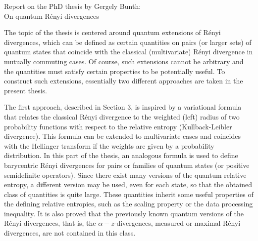 \documentclass[12pt]{article}
\begin{document}
\begin{center}
{\large Report on the PhD thesis by Gergely Bunth: \\
On quantum R\'enyi divergences }

\end{center}
\medskip


\bigskip

The topic of the thesis is centered around quantum extensions of R\'enyi divergences, which can be
defined  as certain quantities on pairs (or larger sets) of quantum states that coincide with the
classical (multivariate) R\'enyi divergence in mutually commuting cases. Of course, such extensions cannot
be arbitrary and the quantities must satisfy certain properties to be potentially useful.
To construct such extensions, essentially two different approaches are taken in the
present thesis. 

The first approach, described in Section 3, is inspired by a variational formula that relates the classical R\'enyi divergence to the weighted (left) radius of two probability functions with respect to the relative entropy
(Kullback-Leibler divergence). This formula can be extended to multivariate
cases and coincides with the Hellinger transform if the weights are given by a probability
distribution. 
In this part of the thesis, an analogous formula is used to define barycentric R\'enyi
divergences for pairs or families of quantum states (or positive semidefinite operators). 
Since there exist many versions of the quantum relative entropy,  a different version  may be used, even for each state,
so that the obtained class of quantities is quite large.  These quantities inherit some useful properties of the defining relative entropies, such as the scaling property or the data processing inequality. It is also proved that 
 the previously known quantum versions of the R\'enyi divergences, that is,  the
$\alpha-z$-divergences, measured or maximal R\'enyi divergences, are not contained in this
class. 
\end{document}
